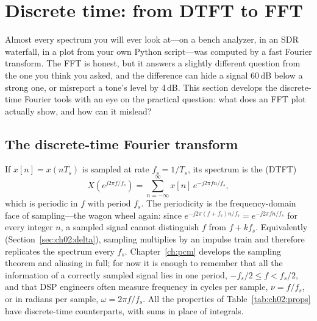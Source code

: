 \section{Discrete time: from DTFT to FFT}
\label{sec:ch02:dft}

Almost every spectrum you will ever look at---on a bench analyzer, in an SDR waterfall, in a
plot from your own Python script---was computed by a fast Fourier transform. The FFT is honest, but
it answers a slightly different question from the one you think you asked, and the difference can
hide a signal 60\,dB below a strong one, or misreport a tone's level by 4\,dB. This section develops
the discrete-time Fourier tools with an eye on the practical question: what does an FFT plot
actually show, and how can it mislead?


\subsection{The discrete-time Fourier transform}

If $x[n]=x(nT_s)$ is sampled at rate $f_s=1/T_s$, its spectrum is the
 (DTFT)
\begin{equation}
X(e^{j2\pi f/f_s})=\sum_{n=-\infty}^{\infty}x[n]\,e^{-j2\pi fn/f_s},
\label{eq:ch02:dtft}
\end{equation}
which is periodic in $f$ with period $f_s$. The periodicity is the frequency-domain face of
sampling---the wagon wheel again: since $e^{-j2\pi(f+f_s)n/f_s}=e^{-j2\pi fn/f_s}$ for every integer
$n$, a sampled signal cannot distinguish $f$ from $f+kf_s$. Equivalently
(Section~\ref{sec:ch02:delta}), sampling multiplies by an impulse train and therefore replicates the
spectrum every $f_s$. Chapter~\ref{ch:pcm} develops the sampling theorem and aliasing in full; for
now it is enough to remember that all the information of a correctly sampled signal lies in one
period, $-f_s/2\le f<f_s/2$, and that DSP engineers often measure frequency in cycles per sample,
$\nu=f/f_s$, or in radians per sample, $\omega=2\pi f/f_s$. All the properties of
Table~\ref{tab:ch02:props} have discrete-time counterparts, with sums in place of integrals.

